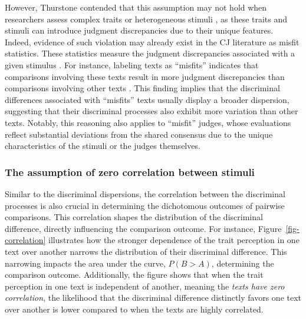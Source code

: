 \documentclass[
  authoryear,
  preprint,
  1p]{elsarticle}
\begin{document}
However, Thurstone contended that this assumption may not hold when
researchers assess complex traits or heterogeneous stimuli
\citep[pp.~376]{Thurstone_1927a}, as these traits and stimuli can
introduce judgment discrepancies due to their unique features. Indeed,
evidence of such violation may already exist in the CJ literature as
misfit statistics. These statistics measure the judgment discrepancies
associated with a given stimulus
\citetext{\citealp[pp.~12]{Pollitt_2004}; \citealp[pp.~20]{Goossens_et_al_2018}}.
For instance, labeling texts as ``misfits'' indicates that comparisons
involving these texts result in more judgment discrepancies than
comparisons involving other texts
\citep{Pollitt_2012a, Pollitt_2012b, vanDaal_et_al_2016, Goossens_et_al_2018}.
This finding implies that the discriminal differences associated with
``misfits'' texts usually display a broader dispersion, suggesting that
their discriminal processes also exhibit more variation than other
texts. Notably, this reasoning also applies to ``misfit'' judges, whose
evaluations reflect substantial deviations from the shared consensus due
to the unique characteristics of the stimuli or the judges themselves.

\subsubsection{The assumption of zero correlation between
stimuli}\label{the-assumption-of-zero-correlation-between-stimuli}

Similar to the discriminal dispersions, the correlation between the
discriminal processes is also crucial in determining the dichotomous
outcomes of pairwise comparisons. This correlation shapes the
distribution of the discriminal difference, directly influencing the
comparison outcome. For instance, Figure~\ref{fig-correlation}
illustrates how the stronger dependence of the trait perception in one
text over another narrows the distribution of their discriminal
difference. This narrowing impacts the area under the curve, \(P(B>A)\),
determining the comparison outcome. Additionally, the figure shows that
when the trait perception in one text is independent of another, meaning
the \emph{texts have zero correlation}, the likelihood that the
discriminal difference distinctly favors one text over another is lower
compared to when the texts are highly correlated.
\end{document}
